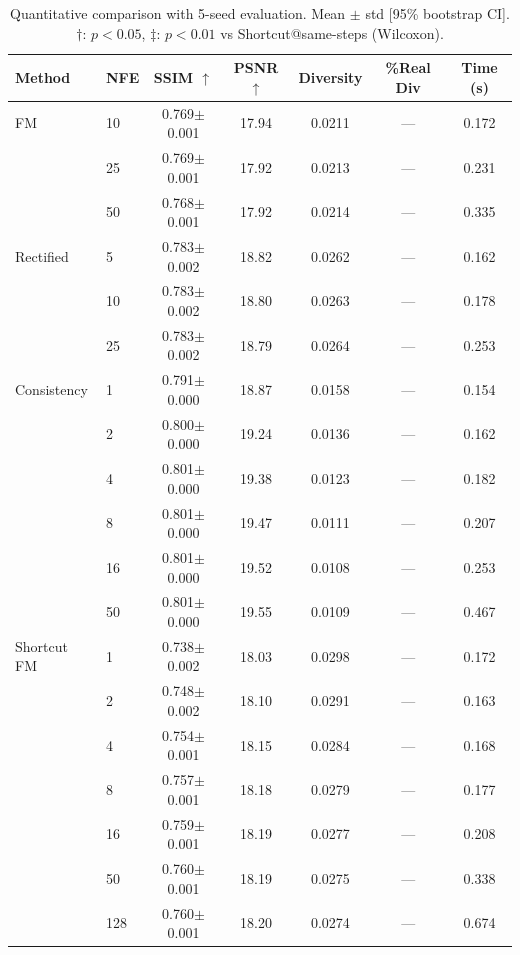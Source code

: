 \begin{table}[t]
\centering
\caption{Quantitative comparison with 5-seed evaluation. Mean $\pm$ std [95\% bootstrap CI]. $\dagger$: $p<0.05$, $\ddagger$: $p<0.01$ vs Shortcut@same-steps (Wilcoxon).}
\label{tab:main_5seed}
\footnotesize
\begin{tabular}{llccccc}
\toprule
Method & NFE & SSIM $\uparrow$ & PSNR $\uparrow$ & Diversity & \%Real Div & Time (s) \\
\midrule
  FM & 10 & 0.769$\pm$0.001 & 17.94 & 0.0211 & — & 0.172 \\
   & 25 & 0.769$\pm$0.001 & 17.92 & 0.0213 & — & 0.231 \\
   & 50 & 0.768$\pm$0.001 & 17.92 & 0.0214 & — & 0.335 \\
\midrule
  Rectified & 5 & 0.783$\pm$0.002 & 18.82 & 0.0262 & — & 0.162 \\
   & 10 & 0.783$\pm$0.002 & 18.80 & 0.0263 & — & 0.178 \\
   & 25 & 0.783$\pm$0.002 & 18.79 & 0.0264 & — & 0.253 \\
\midrule
  Consistency & 1 & 0.791$\pm$0.000 & 18.87 & 0.0158 & — & 0.154 \\
   & 2 & 0.800$\pm$0.000 & 19.24 & 0.0136 & — & 0.162 \\
   & 4 & 0.801$\pm$0.000 & 19.38 & 0.0123 & — & 0.182 \\
   & 8 & 0.801$\pm$0.000 & 19.47 & 0.0111 & — & 0.207 \\
   & 16 & 0.801$\pm$0.000 & 19.52 & 0.0108 & — & 0.253 \\
   & 50 & 0.801$\pm$0.000 & 19.55 & 0.0109 & — & 0.467 \\
\midrule
  Shortcut FM & 1 & 0.738$\pm$0.002 & 18.03 & 0.0298 & — & 0.172 \\
   & 2 & 0.748$\pm$0.002 & 18.10 & 0.0291 & — & 0.163 \\
   & 4 & 0.754$\pm$0.001 & 18.15 & 0.0284 & — & 0.168 \\
   & 8 & 0.757$\pm$0.001 & 18.18 & 0.0279 & — & 0.177 \\
   & 16 & 0.759$\pm$0.001 & 18.19 & 0.0277 & — & 0.208 \\
   & 50 & 0.760$\pm$0.001 & 18.19 & 0.0275 & — & 0.338 \\
   & 128 & 0.760$\pm$0.001 & 18.20 & 0.0274 & — & 0.674 \\
\bottomrule
\end{tabular}
\end{table}